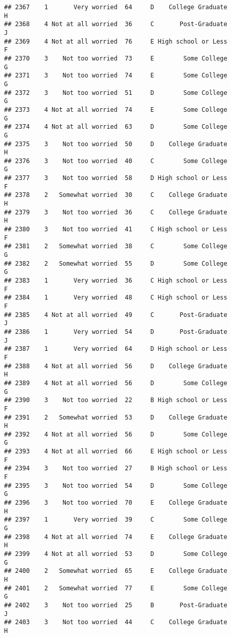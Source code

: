 \documentclass[
]{article}
\begin{document}
\begin{verbatim}
## 2367    1       Very worried  64     D    College Graduate         H
## 2368    4 Not at all worried  36     C       Post-Graduate         J
## 2369    4 Not at all worried  76     E High school or Less         F
## 2370    3    Not too worried  73     E        Some College         G
## 2371    3    Not too worried  74     E        Some College         G
## 2372    3    Not too worried  51     D        Some College         G
## 2373    4 Not at all worried  74     E        Some College         G
## 2374    4 Not at all worried  63     D        Some College         G
## 2375    3    Not too worried  50     D    College Graduate         H
## 2376    3    Not too worried  40     C        Some College         G
## 2377    3    Not too worried  58     D High school or Less         F
## 2378    2   Somewhat worried  30     C    College Graduate         H
## 2379    3    Not too worried  36     C    College Graduate         H
## 2380    3    Not too worried  41     C High school or Less         F
## 2381    2   Somewhat worried  38     C        Some College         G
## 2382    2   Somewhat worried  55     D        Some College         G
## 2383    1       Very worried  36     C High school or Less         F
## 2384    1       Very worried  48     C High school or Less         F
## 2385    4 Not at all worried  49     C       Post-Graduate         J
## 2386    1       Very worried  54     D       Post-Graduate         J
## 2387    1       Very worried  64     D High school or Less         F
## 2388    4 Not at all worried  56     D    College Graduate         H
## 2389    4 Not at all worried  56     D        Some College         G
## 2390    3    Not too worried  22     B High school or Less         F
## 2391    2   Somewhat worried  53     D    College Graduate         H
## 2392    4 Not at all worried  56     D        Some College         G
## 2393    4 Not at all worried  66     E High school or Less         F
## 2394    3    Not too worried  27     B High school or Less         F
## 2395    3    Not too worried  54     D        Some College         G
## 2396    3    Not too worried  70     E    College Graduate         H
## 2397    1       Very worried  39     C        Some College         G
## 2398    4 Not at all worried  74     E    College Graduate         H
## 2399    4 Not at all worried  53     D        Some College         G
## 2400    2   Somewhat worried  65     E    College Graduate         H
## 2401    2   Somewhat worried  77     E        Some College         G
## 2402    3    Not too worried  25     B       Post-Graduate         J
## 2403    3    Not too worried  44     C    College Graduate         H

\end{verbatim}
\end{document}
